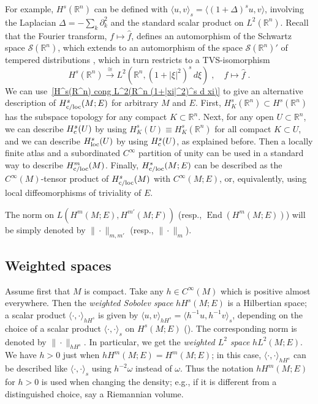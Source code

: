 \documentclass{memo-l}
\theoremstyle{plain}
\theoremstyle{definition}
\theoremstyle{remark}
\newcommand{\R}{\mathbb{R}}
\renewcommand{\SS}{\mathcal{S}}
\newcommand{\End}{\operatorname{End}}
\newcommand{\co}{{\text{\rm c}}}
\numberwithin{section}{chapter}
\numberwithin{equation}{section}%
\begin{document}
For example, $H^s(\R^n)$ can be defined with $\langle u,v\rangle_s=\langle(1+\Delta)^su,v\rangle$, involving the Laplacian $\Delta=-\sum_k\partial_k^2$ and the standard scalar product on $L^2(\R^n)$. Recall that the Fourier transform, $f\mapsto\hat f$, defines an automorphism of the Schwartz space $\SS(\R^n)$, which extends to an automorphism of the space $\SS(\R^n)'$ of tempered distributions \cite[Section~7.1]{Hormander1983-I}, which in turn restricts to a TVS-isomorphism
\begin{equation}\label{H^s(R^n) cong L^2(R^n (1+|xi|^2)^s d xi)}
H^s(\R^n)\xrightarrow{\cong} L^2(\R^n,(1+|\xi|^2)^s\,d\xi)\;,\quad f\mapsto\hat f\;.
\end{equation}
We can use~\eqref{H^s(R^n) cong L^2(R^n (1+|xi|^2)^s d xi)} to give an alternative description of $H^s_{\text{\rm c/loc}}(M;E)$ for arbitrary $M$ and $E$. First, $H^s_K(\R^n)\subset H^s(\R^n)$ has the subspace topology for any compact $K\subset\R^n$. Next, for any open $U\subset\R^n$, we can describe $H^s_\co(U)$ by using $H^s_K(U)\equiv H^s_K(\R^n)$ for all compact $K\subset U$, and we can describe $H^s_{\text{\rm loc}}(U)$ by using $H^s_\co(U)$, as explained before. Then a locally finite atlas and a subordinated $C^\infty$ partition of unity can be used in a standard way to describe $H^m_{\text{\rm c/loc}}(M)$. Finally, $H^s_{\text{\rm c/loc}}(M;E)$ can be described as the $C^\infty(M)$-tensor product of $H^s_{\text{\rm c/loc}}(M)$ with $C^\infty(M;E)$, or, equivalently, using local diffeomorphisms of triviality of $E$.

The norm on $L(H^m(M;E),H^{m'}(M;F))$ (resp., $\End(H^m(M;E))$) will be simply denoted by $\|{\cdot}\|_{m,m'}$ (resp., $\|{\cdot}\|_m$).



\subsection{Weighted spaces}\label{ss: weighted sps}

Assume first that $M$ is compact. Take any $h\in C^\infty(M)$ which is positive almost everywhere. Then the \emph{weighted Sobolev space} $hH^s(M;E)$ is a Hilbertian space; a scalar product $\langle{\cdot},{\cdot}\rangle_{hH^s}$ is given by $\langle u,v\rangle_{hH^s}=\langle h^{-1}u,h^{-1}v\rangle_s$, depending on the choice of a scalar product $\langle{\cdot},{\cdot}\rangle_s$ on $H^s(M;E)$ (). The corresponding norm is denoted by $\|{\cdot}\|_{hH^s}$. In particular, we get the \emph{weighted $L^2$ space} $hL^2(M;E)$. We have $h>0$ just when $hH^m(M;E)=H^m(M;E)$; in this case, $\langle{\cdot},{\cdot}\rangle_{hH^s}$ can be described like $\langle{\cdot},{\cdot}\rangle_s$ using $h^{-2}\omega$ instead of $\omega$. Thus the notation $hH^m(M;E)$ for $h>0$ is used when changing the density; e.g.,  if it is different from a distinguished choice, say a Riemannian volume.
\end{document}
